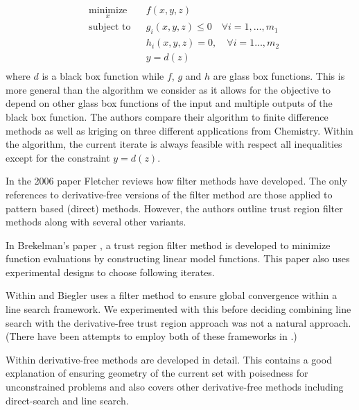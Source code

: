 \documentclass{article}
\begin{document}
\begin{equation*}
\begin{aligned}
& \underset{x}{\text{minimize}} & & f(x, y, z) \\
& \text{subject to} & & g_i(x, y, z) \leq 0 \quad \forall i = 1, \ldots, m_1 \\
& & & h_i(x, y, z) = 0, \quad \forall i = 1 \ldots, m_2 \\
& & & y = d(z) \;  \\
\end{aligned}
\end{equation*}
where $d$ is a black box function while $f$, $g$ and $h$ are glass box functions.
This is more general than the algorithm we consider as it allows for the objective to depend on other glass box functions of the input and multiple outputs of the black box function. The authors compare their algorithm to finite difference methods as well as kriging on three different applications from Chemistry. Within the algorithm, the current iterate is always feasible with respect all inequalities except for the constraint $y=d(z)$.





In the 2006 paper \cite{DUMMY:Fletcher} Fletcher reviews how filter methods have developed. The only references to derivative-free versions of the filter method are those applied to pattern based (direct) methods. However, the authors outline trust region filter methods along with several other variants.

In Brekelman's paper \cite{DUMMY:Brekelman}, a trust region filter method is developed to minimize function evaluations by constructing linear model functions. This paper also uses experimental designs to choose following iterates.


Within \cite{DUMMY:linesearch_global} and \cite{DUMMY:linesearch_local} Biegler uses a filter method to ensure global convergence within a line search framework. We experimented with this before deciding combining line search with the derivative-free trust region approach was not a natural approach. (There have been attempts to employ both of these frameworks in \cite{DUMMY:CombineTrustAndLine}.)


Within  \cite{DUMMY:intro_book} derivative-free methods are developed in detail. This contains a good explanation of ensuring geometry of the current set with poisedness for unconstrained problems and also covers other derivative-free methods including direct-search and line search.
\end{document}
